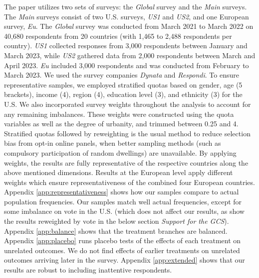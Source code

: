 \begin{small}
The paper utilizes two sets of surveys: the \textit{Global} survey and the \textit{Main} surveys. The \textit{Main} surveys consist of two U.S. surveys, \textit{US1} and \textit{US2}, and one European survey, \textit{Eu}. The \textit{Global} survey was conducted from March 2021 to March 2022 on 40,680 respondents from 20 countries (with 1,465 to 2,488 respondents per country). \textit{US1} collected responses from 3,000 respondents between January and March 2023, while \textit{US2} gathered data from 2,000 respondents between March and April 2023. \textit{Eu} included 3,000 respondents and was conducted from February to March 2023. We used the survey companies \emph{Dynata} and \emph{Respondi}. To ensure representative samples, we employed stratified quotas based on gender, age (5 brackets), income (4), region (4), education level (3), and ethnicity (3) for the U.S. We also incorporated survey weights throughout the analysis to account for any remaining imbalances. These weights were constructed using the quota variables as well as the degree of urbanity, and trimmed between 0.25 and 4. Stratified quotas followed by reweighting is the usual method to reduce selection bias from opt-in online panels, when better sampling methods (such as compulsory participation of random dwellings) are unavailable.\cite{scherpenzeel_how_2010} By applying weights, the results are fully representative of the respective countries along the above mentioned dimensions. %
Results at the European level apply different weights which ensure  representativeness of the combined four European countries. Appendix \ref{app:representativeness} shows how our samples compare to actual population frequencies. Our samples match well actual frequencies, except for some imbalance on vote in the U.S. (which does not affect our results, as show the results reweighted by vote in the below section \textit{Support for the GCS}). %
Appendix \ref{app:balance} shows that the treatment branches are balanced. Appendix \ref{app:placebo} runs placebo tests of the effects of each treatment on unrelated outcomes. We do not find effects of earlier treatments on unrelated outcomes arriving later in the survey. Appendix \ref{app:extended} shows that our results are robust to including inattentive respondents.



\end{small}
